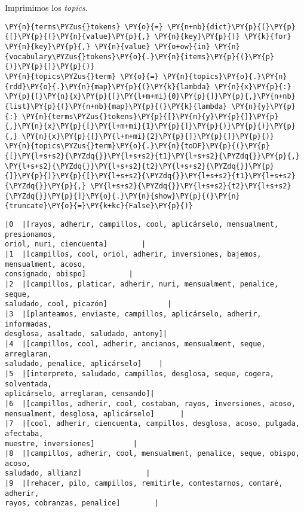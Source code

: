  Imprimimos los \textit{topics}.
 
\vspace{0.5cm}


    \begin{tcolorbox}[breakable, size=fbox, boxrule=1pt, pad at break*=1mm,colback=cellbackground, colframe=cellborder]
\begin{Verbatim}[commandchars=\\\{\}]
\PY{n}{terms\PYZus{}tokens} \PY{o}{=} \PY{n+nb}{dict}\PY{p}{(}\PY{p}{[}\PY{p}{(}\PY{n}{value}\PY{p}{,} \PY{n}{key}\PY{p}{)} \PY{k}{for} \PY{n}{key}\PY{p}{,} \PY{n}{value} \PY{o+ow}{in} \PY{n}{vocabulary\PYZus{}tokens}\PY{o}{.}\PY{n}{items}\PY{p}{(}\PY{p}{)}\PY{p}{]}\PY{p}{)}
\PY{n}{topics\PYZus{}term} \PY{o}{=} \PY{n}{topics}\PY{o}{.}\PY{n}{rdd}\PY{o}{.}\PY{n}{map}\PY{p}{(}\PY{k}{lambda} \PY{n}{x}\PY{p}{:} \PY{p}{[}\PY{n}{x}\PY{p}{[}\PY{l+m+mi}{0}\PY{p}{]}\PY{p}{,}\PY{n+nb}{list}\PY{p}{(}\PY{n+nb}{map}\PY{p}{(}\PY{k}{lambda} \PY{n}{y}\PY{p}{:} \PY{n}{terms\PYZus{}tokens}\PY{p}{[}\PY{n}{y}\PY{p}{]}\PY{p}{,}\PY{n}{x}\PY{p}{[}\PY{l+m+mi}{1}\PY{p}{]}\PY{p}{)}\PY{p}{)}\PY{p}{,} \PY{n}{x}\PY{p}{[}\PY{l+m+mi}{2}\PY{p}{]}\PY{p}{]}\PY{p}{)}
\PY{n}{topics\PYZus{}term}\PY{o}{.}\PY{n}{toDF}\PY{p}{(}\PY{p}{[}\PY{l+s+s2}{\PYZdq{}}\PY{l+s+s2}{t1}\PY{l+s+s2}{\PYZdq{}}\PY{p}{,} \PY{l+s+s2}{\PYZdq{}}\PY{l+s+s2}{t2}\PY{l+s+s2}{\PYZdq{}}\PY{p}{]}\PY{p}{)}\PY{p}{[}\PY{l+s+s2}{\PYZdq{}}\PY{l+s+s2}{t1}\PY{l+s+s2}{\PYZdq{}}\PY{p}{,} \PY{l+s+s2}{\PYZdq{}}\PY{l+s+s2}{t2}\PY{l+s+s2}{\PYZdq{}}\PY{p}{]}\PY{o}{.}\PY{n}{show}\PY{p}{(}\PY{n}{truncate}\PY{o}{=}\PY{k+kc}{False}\PY{p}{)}
\end{Verbatim}
\end{tcolorbox}

    \begin{Verbatim}[commandchars=\\\{\}]
|0  |[rayos, adherir, campillos, cool, aplicárselo, mensualment, presionamos,
oriol, nuri, ciencuenta]        |
|1  |[campillos, cool, oriol, adherir, inversiones, bajemos, mensualment, acoso,
consignado, obispo]          |
|2  |[campillos, platicar, adherir, nuri, mensualment, penalice, seque,
saludado, cool, picazón]              |
|3  |[planteamos, enviaste, campillos, aplicárselo, adherir, informadas,
desglosa, asaltado, saludado, antony]|
|4  |[campillos, cool, adherir, ancianos, mensualment, seque, arreglaran,
saludado, penalice, aplicárselo]    |
|5  |[interpreto, saludado, campillos, desglosa, seque, cogera, solventada,
aplicárselo, arreglaran, censando]|
|6  |[campillos, adherir, cool, costaban, rayos, inversiones, acoso,
mensualment, desglosa, aplicárselo]      |
|7  |[cool, adherir, ciencuenta, campillos, desglosa, acoso, pulgada, afectaba,
muestre, inversiones]         |
|8  |[campillos, adherir, cool, mensualment, penalice, seque, obispo, acoso,
saludado, allianz]               |
|9  |[rehacer, pilo, campillos, remitirle, contestarnos, contaré, adherir,
rayos, cobranzas, penalice]        |

    \end{Verbatim}

